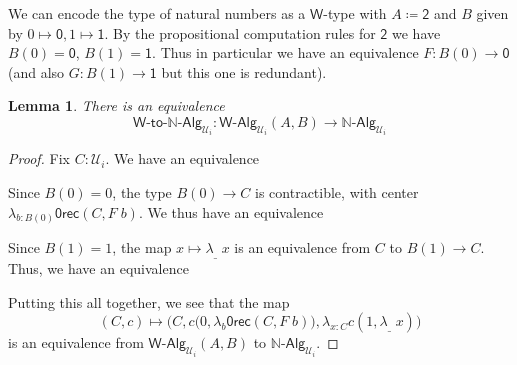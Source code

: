 \documentclass[reqno,10pt,a4paper,oneside]{amsart}
\newcommand{\prd}[1]{\Pi_{#1}}
\newcommand{\lam}[1]{\lambda_{#1}}
\newcommand{\defeq}{\coloneqq}
\newcommand{\nat}{\ensuremath{\mathbb{N}}}
\newcommand{\W}{\mathsf{W}}
\newcommand{\Bool}{\mathsf{2}}
\newcommand{\one}{\mathsf{1}}
\newcommand{\zero}{\mathsf{0}}
\newcommand{\UU}{\mathcal{U}}
\newcommand{\NatAlg}{\nat\text{-}\mathsf{Alg}}
\newcommand{\WAlgToNatAlg}{\W\text{-}\mathsf{to}\text{-}\nat\text{-}\mathsf{Alg}}
\newcommand{\WAlg}{\mathsf{W}\text{-}\mathsf{Alg}}
\newcommand{\abort}{\mathsf{0rec}}
\numberwithin{equation}{section}
\theoremstyle{mythm}
\newtheorem{lemma}[theorem]{Lemma}
\theoremstyle{mydef}
\theoremstyle{myrmk}
\begin{document}
We can encode the type of natural numbers as a $\W$-type with $A \defeq \Bool$ and $B$ given by $0 \mapsto \zero, 1 \mapsto \one$. By the propositional computation rules for $\Bool$ we have $B(0) = \zero$, $B(1) = \one$. Thus in particular we have an equivalence $F : B(0) \to \zero$ (and also $G : B(1) \to \one$ but this one is redundant).
\begin{lemma}
There is an equivalence
\[ \WAlgToNatAlg_{\UU_i} : \WAlg_{\UU_i}(A,B) \to \NatAlg_{\UU_i} \]
\end{lemma}
\begin{proof}
Fix $C : \UU_i$. We have an equivalence
\begin{center}
\end{center}
Since $B(0) = 0$, the type $B(0) \to C$ is contractible, with center $\lam{b:B(0)} \abort(C,F \; b)$. We thus have an equivalence
\begin{center}
\end{center}
Since $B(1) = 1$, the map $x \mapsto \lam{\_}\; x$ is an equivalence from $C$ to $B(1) \to C$. Thus, we have an equivalence
\begin{center}
\end{center}
Putting this all together, we see that the map 
\[ (C,c) \mapsto \Big(C,c\big(0,\lam{b} \abort(C,F \; b)\big),\lam{x:C} c(1, \lam{\_} \; x)\Big)\] 
is an equivalence from $\WAlg_{\UU_i}(A,B)$ to $\NatAlg_{\UU_i}$.
\end{proof}
\end{document}
